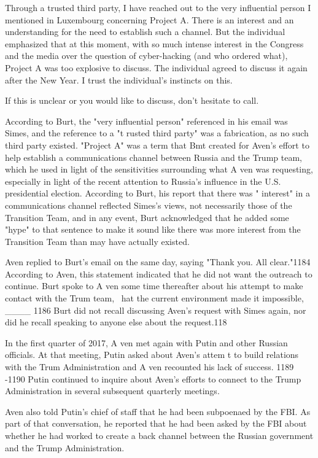 Through a trusted third party, I have reached out to the very influential person I mentioned in Luxembourg concerning Project A. There is an interest and an understanding for the need to establish such a channel. But the individual emphasized that at this moment, with so much intense interest in the Congress and the media over the question of cyber-hacking (and who ordered what), Project A was too explosive to discuss. The individual agreed to discuss it again after the New Year. I trust the individual's instincts on this.

If this is unclear or you would like to discuss, don't hesitate to call.%

According to Burt, the "very influential person" referenced in his email was Simes, and the reference to a "t rusted third party" was a fabrication, as no such third party existed. "Project A" was a term that Bmt created for Aven's effort to help establish a communications channel between Russia and the Trump team, which he used in light of the sensitivities surrounding what A ven was requesting, especially in light of the recent attention to Russia's influence in the U.S. presidential election.%
According to Burt, his report that there was " interest" in a communications channel reflected Simes's views, not necessarily those of the Transition Team, and in any event, Burt acknowledged that he added some "hype" to that sentence to make it sound like there was more interest from the Transition Team than may have actually existed.%

Aven replied to Burt's email on the same day, saying "Thank you. All clear."1184 According to Aven, this statement indicated that he did not want the outreach to continue.%
Burt spoke to A ven some time thereafter about his attempt to make contact with the Trum team, ~hat the current environment made it impossible, ____ 1186 Burt did not recall discussing Aven's request with Simes again, nor did he recall speaking to anyone else about the request.118

In the first quarter of 2017, A ven met again with Putin and other Russian officials.%
At that meeting, Putin asked about Aven's attem t to build relations with the Trum Administration and A ven recounted his lack of success. 1189 -1190 Putin continued to inquire about Aven's efforts to connect to the Trump Administration in several subsequent quarterly meetings.%

Aven also told Putin's chief of staff that he had been subpoenaed by the FBI.%
As part of that conversation, he reported that he had been asked by the FBI about whether he had worked to create a back channel between the Russian government and the Trump Administration.%

